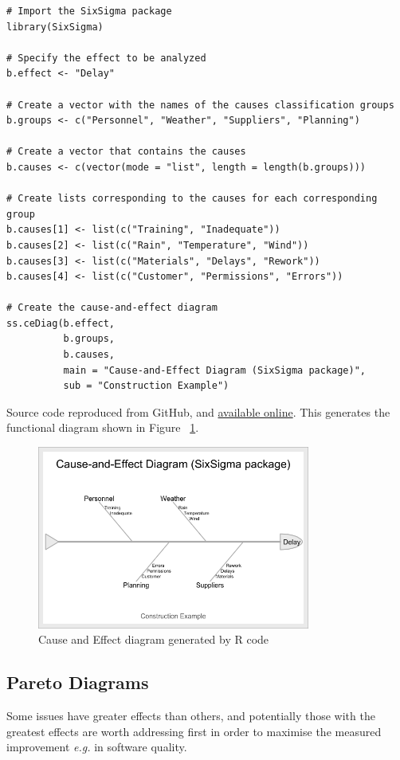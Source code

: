 \begin{lstlisting}
# Import the SixSigma package
library(SixSigma)

# Specify the effect to be analyzed
b.effect <- "Delay"

# Create a vector with the names of the causes classification groups
b.groups <- c("Personnel", "Weather", "Suppliers", "Planning")

# Create a vector that contains the causes
b.causes <- c(vector(mode = "list", length = length(b.groups)))

# Create lists corresponding to the causes for each corresponding group
b.causes[1] <- list(c("Training", "Inadequate"))
b.causes[2] <- list(c("Rain", "Temperature", "Wind"))
b.causes[3] <- list(c("Materials", "Delays", "Rework"))
b.causes[4] <- list(c("Customer", "Permissions", "Errors"))

# Create the cause-and-effect diagram
ss.ceDiag(b.effect,
          b.groups,
          b.causes,
          main = "Cause-and-Effect Diagram (SixSigma package)",
          sub = "Construction Example")
\end{lstlisting}
Source code reproduced from GitHub, and \href{https://gist.github.com/rsalaza4/eff4a0a7e8e4894e4b82152fcf66e847/raw/cfbfe93c784989ee8fd6b686dd26fb88f4cec26d/Cause-and-effect\%20diagram.R}{available online}. This generates the functional diagram shown in Figure ~\ref{fig:ishikawa-example-in-R}.

\begin{figure}[ht]
    \centering
    \includegraphics[width=0.8\textwidth]{images/cause-effect-diagram.png}
    \caption{Cause and Effect diagram generated by R code}
    \label{fig:ishikawa-example-in-R}
\end{figure}

\hypertarget{pareto.diagrams.in.r}{}
\subsection{Pareto Diagrams}
Some issues have greater effects than others, and potentially those with the greatest effects are worth addressing first in order to maximise the measured improvement \emph{e.g.} in software quality.

